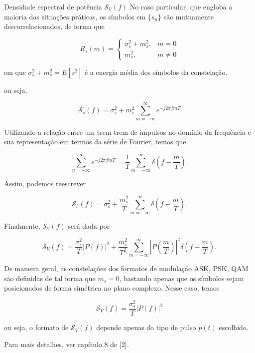 \documentclass[
  ignorenonframetext,
]{beamer}
\begin{document}
\begin{frame}{Densidade espectral de potência \(\mathcal{S}_{V}(f)\)}
No caso particular, que engloba a maioria das situações práticas, os
símbolos em \(\{s_n\}\) são mutuamente descorrelacionados, de forma que

\begin{equation}
R_{s}(m) = \begin{cases}\sigma_{s}^{2}+m_{s}^{2}, & m=0 \\ m_{s}^{2}, & m \neq 0\end{cases}
\end{equation}

em que \(\sigma_{s}^{2}+m_{s}^{2}=E[s^2]\) é a energia média dos
símbolos da constelação.

ou seja,

\begin{equation}
\mathcal{S}_{s}(f)=\sigma_{s}^{2}+m_{s}^{2} \sum_{m=-\infty}^{\infty} e^{-j 2 \pi f m T}
\end{equation}

Utilizando a relação entre um trem trem de impulsos no domínio da
frequência e sua representação em termos da série de Fourier, temos que

\begin{equation}
\sum_{n=-\infty}^{\infty} e^{-j 2 \pi f mT}=\frac{1}{T} \sum_{m=-\infty}^{\infty} \delta\left(f-\frac{m}{T}\right).
\end{equation}

Assim, podemos reescrever

\begin{equation}
\mathcal{S}_{s}(f)=\sigma_{s}^{2}+\frac{m_{s}^{2}}{T} \sum_{m=-\infty}^{\infty} \delta\left(f-\frac{m}{T}\right).
\end{equation}

Finalmente, \(\mathcal{S}_{V}(f)\) será dada por

\begin{equation}
\mathcal{S}_{V}(f)=\frac{\sigma_{s}^{2}}{T}\left|P(f)\right|^{2}+\frac{m_{s}^{2}}{T^{2}} \sum_{m=-\infty}^{\infty}\left|P\left(\frac{m}{T}\right)\right|^{2} \delta\left(f-\frac{m}{T}\right).
\end{equation}

De maneira geral, as constelações dos formatos de modulação ASK, PSK,
QAM são definidas de tal forma que \(m_{s}=0\), bastando apenas que os
símbolos sejam posicionados de forma simétrica no plano complexo. Nesse
caso, temos

\begin{equation}
\mathcal{S}_{V}(f)=\frac{\sigma_{s}^{2}}{T}\left|P(f)\right|^{2}
\end{equation}

ou seja, o formato de \(\mathcal{S}_{V}(f)\) depende apenas do tipo de
pulso \(p(t)\) escolhido.

Para mais detalhes, ver capítulo 8 de {[}2{]}.
\end{frame}
\end{document}
